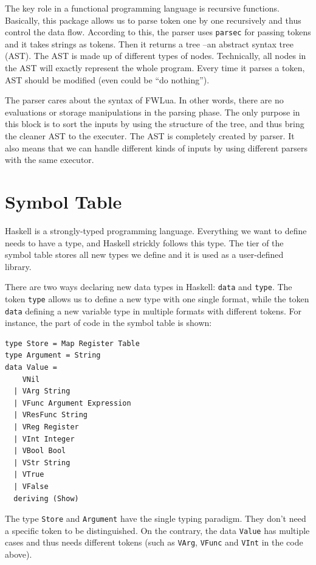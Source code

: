 The key role in a functional programming language is recursive functions. Basically, this package allows us to parse token one by one recursively and thus control the data flow. According to this, the parser uses {\tt parsec} for passing tokens and it takes strings as tokens. Then it returns a tree --an abstract syntax tree (AST).
The AST is made up of different types of nodes.
Technically, all nodes in the AST will exactly represent the whole program. Every time it parses a token, AST should be modified (even could be ``do nothing'').


The parser cares about the syntax of FWLua. In other words, there are no evaluations or storage manipulations in the parsing phase. The only purpose in this block is to sort the inputs by using the structure of the tree, and thus bring the cleaner AST to the executer. The AST is completely created by parser. It also means that we can handle different kinds of inputs by using different parsers with the same executor.

\section{Symbol Table}
Haskell is a strongly-typed programming language. Everything we want to define needs to have a type, and Haskell strickly follows this type. The tier of the symbol table stores all new types we define and it is used as a user-defined library.

There are two ways declaring new data types in Haskell: {\tt data} and {\tt type}. The token {\tt type} allows us to define a new type with one single format, while the token {\tt data} defining a new variable type in multiple formats with different tokens. For instance, the part of code in the symbol table is shown:

\begin{verbatim}
type Store = Map Register Table
type Argument = String
data Value = 
    VNil
  | VArg String
  | VFunc Argument Expression
  | VResFunc String
  | VReg Register
  | VInt Integer
  | VBool Bool
  | VStr String
  | VTrue
  | VFalse
  deriving (Show)
\end{verbatim}

The type {\tt Store} and {\tt Argument} have the single typing paradigm. They don't need a specific token to be distinguished. On the contrary, the data {\tt Value} has multiple cases and thus needs different tokens (such as {\tt VArg}, {\tt VFunc} and {\tt VInt} in the code above).

